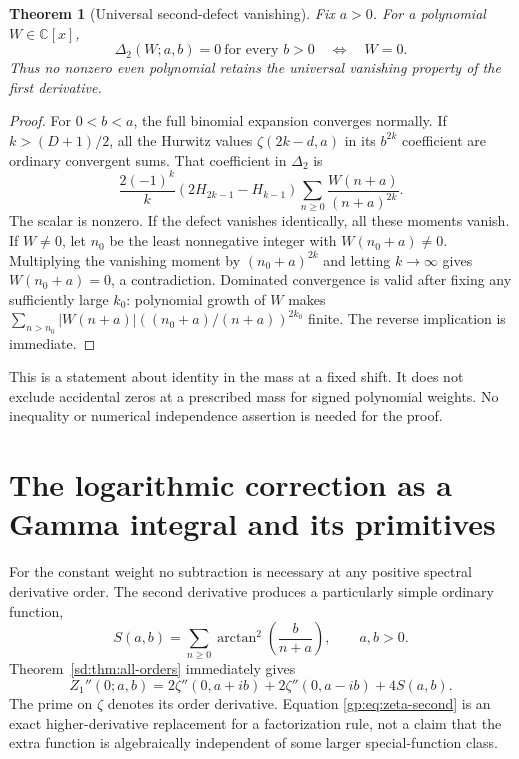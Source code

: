 \documentclass[11pt,a4paper]{article}
\numberwithin{equation}{section}
\newtheorem{theorem}{Theorem}[section]
\theoremstyle{definition}
\theoremstyle{remark}
\begin{document}
\begin{theorem}[Universal second-defect vanishing]
\label{sd:thm:vanishing}
Fix $a>0$.  For a polynomial $W\in\mathbb C[x]$,
\[
 \Delta_2(W;a,b)=0\ \text{for every }b>0
 \quad\Longleftrightarrow\quad W=0.
\]
Thus no nonzero even polynomial retains the universal vanishing
property of the first derivative.
\end{theorem}
\begin{proof}
For $0<b<a$, the full binomial expansion converges normally.  If
$k>(D+1)/2$, all the Hurwitz values $\zeta(2k-d,a)$ in its
$b^{2k}$ coefficient are ordinary convergent sums.  That coefficient
in $\Delta_2$ is
\begin{equation}\label{sd:eq:high-mass-coeff}
 \frac{2(-1)^k}{k}(2H_{2k-1}-H_{k-1})
             \sum_{n\ge0}\frac{W(n+a)}{(n+a)^{2k}}.
\end{equation}
The scalar is nonzero.  If the defect vanishes identically, all these
moments vanish.  If $W\ne0$, let $n_0$ be the least nonnegative integer
with $W(n_0+a)\ne0$.  Multiplying the vanishing moment by
$(n_0+a)^{2k}$ and letting $k\to\infty$ gives
$W(n_0+a)=0$, a contradiction.  Dominated convergence is valid after
fixing any sufficiently large $k_0$: polynomial growth of $W$ makes
$\sum_{n>n_0}|W(n+a)|((n_0+a)/(n+a))^{2k_0}$ finite.
The reverse implication is immediate.
\end{proof}

This is a statement about identity in the mass at a fixed shift.
It does not exclude accidental zeros at a prescribed mass for signed
polynomial weights.  No inequality or numerical independence assertion
is needed for the proof.



\section{The logarithmic correction as a Gamma integral and its primitives}
\label{gp:section}

For the constant weight no subtraction is necessary at any positive
spectral derivative order.  The second derivative produces a particularly
simple ordinary function,
\begin{equation}\label{gp:eq:S}
 S(a,b)=\sum_{n\ge0}\arctan^2\!\left(\frac{b}{n+a}\right),
 \qquad a,b>0.
\end{equation}
Theorem~\ref{sd:thm:all-orders} immediately gives
\begin{equation}\label{gp:eq:zeta-second}
 Z_1''(0;a,b)=2\zeta''(0,a+ib)+2\zeta''(0,a-ib)+4S(a,b).
\end{equation}
The prime on $\zeta$ denotes its order derivative.  Equation
\eqref{gp:eq:zeta-second} is an exact higher-derivative replacement
for a factorization rule, not a claim that the extra function is
algebraically independent of some larger special-function class.
\end{document}
